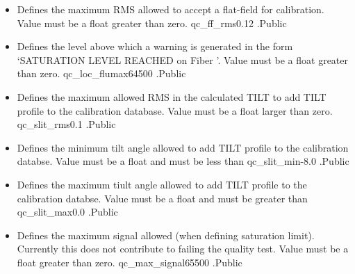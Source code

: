 \begin{itemize}
\item {}
{Defines the maximum RMS allowed to accept a flat-field for calibration. Value must be a float greater than zero.}
{qc\_ff\_rms}{0.12}
{\calFFraw}{\constantsfile}{\calFFraw.\progMAIN}{Public}

\item {}
{Defines the level above which a warning is generated in the form `SATURATION LEVEL REACHED on Fiber '. Value must be a float greater than zero.}
{qc\_loc\_flumax}{64500}
{\calFFraw}{\constantsfile}{\calFFraw.\progMAIN}{Public}

\item {}
{Defines the maximum allowed RMS in the calculated TILT to add TILT profile to the calibration database. Value must be a float larger than zero.}
{qc\_slit\_rms}{0.1}
{\calSLIT}{\constantsfile}{\calSLIT.\progMAIN}{Public}

\item \label{text:c_slit_min} 
{Defines the minimum tilt angle allowed to add TILT profile to the calibration databse. Value must be a float and must be less than }
{qc\_slit\_min}{-8.0}
{\calSLIT}{\constantsfile}{\calSLIT.\progMAIN}{Public}

\item \label{text:c_slit_max} 
{Defines the maximum tiult angle allowed to add TILT profile to the calibration databse. Value must be a float and must be greater than }
{qc\_slit\_max}{0.0}
{\calSLIT}{\constantsfile}{\calSLIT.\progMAIN}{Public}

\item \label{text:qc_max_signal} 
{Defines the maximum signal allowed (when defining saturation limit). Currently this does not contribute to failing the quality test. Value must be a float greater than zero.}
{qc\_max\_signal}{65500}
{\calextractRAW}{\constantsfile}{\calextractRAW.\progMAIN}{Public}


\end{itemize}







